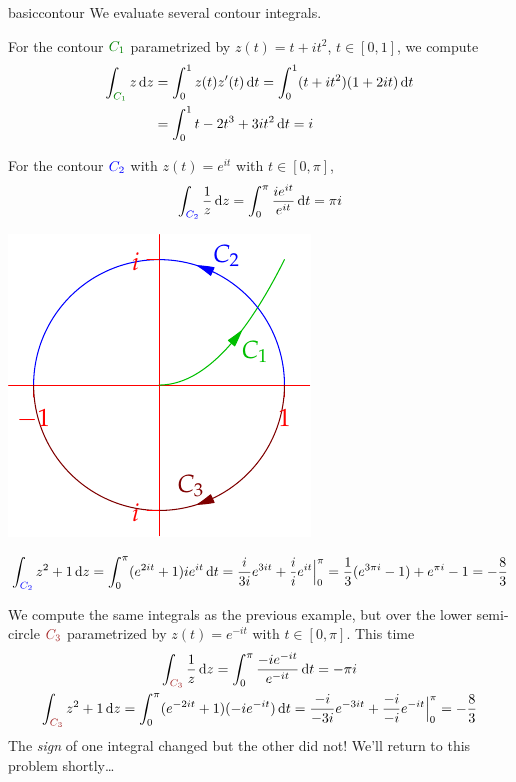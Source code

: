 \begin{examples}{}{basiccontour}
	We evaluate several contour integrals.
	\begin{enumerate}
	  \begin{minipage}[t]{0.65\linewidth}\vspace{-5pt}
		  \item For the contour $\textcolor{Green}{C_1}$ parametrized by $z(t)=t+it^2$, $t\in[0,1]$, we compute
		  \begin{align*}
			  \int_{\textcolor{Green}{C_1}}z\,\dz&=\int_0^1z(t)z'(t)\,\dt=\int_0^1(t+it^2)(1+2it)\,\dt\\
			  &=\int_0^1t-2t^3+3it^2\,\dt=i
		  \end{align*}
		  
		  \item For the contour $\textcolor{blue}{C_2}$ with $z(t)=e^{it}$ with $t\in[0,\pi]$,
		  \[
		  	\int_{\textcolor{blue}{C_2}}\frac 1z\,{\mathrm{d} z} =\int_0^{\pi}\frac{ie^{it}}{e^{it}}\,{\mathrm{d} t} =\pi i
		  \]
	  \end{minipage}
	  \hfill
	  \begin{minipage}[t]{0.34\linewidth}\vspace{-10pt}
	  	\flushright\includegraphics{contours-ex4}
	  \end{minipage}\par
	  \vspace{-10pt}
	  
	  \item[]
	  \[
	  	\int_{\textcolor{blue}{C_2}}z^2+1\,{\mathrm{d} z} =\int_0^{\pi}(e^{2it}+1)ie^{it}\,{\mathrm{d} t} =\frac i{3i}e^{3it}+\frac i{i}e^{it}\Big|_0^{\pi}= \frac 13(e^{3\pi i}-1)+e^{\pi i}-1=-\frac 83
	  \]
	  \item We compute the same integrals as the previous example, but over the lower semi-circle $\textcolor{Brown}{C_3}$ parametrized by $z(t)=e^{-it}$ with $t\in[0,\pi]$. This time
	  \begin{gather*}
	  	\int_{\textcolor{Brown}{C_3}}\frac 1z\,\dz =\int_0^{\pi}\frac{-ie^{-it}}{e^{-it}}\,\dt =-\pi i\\
	  	\int_{\textcolor{Brown}{C_3}}z^2+1\,\dz =\int_0^{\pi}(e^{-2it}+1)(-ie^{-it})\,\dt =\frac{-i}{-3i}e^{-3it}+\frac{-i}{-i}e^{-it}\Big|_0^{\pi}=-\frac 83
	  \end{gather*}
	  The \emph{sign} of one integral changed but the other did not! We'll return to this problem shortly\ldots
	\end{enumerate}
\end{examples}



